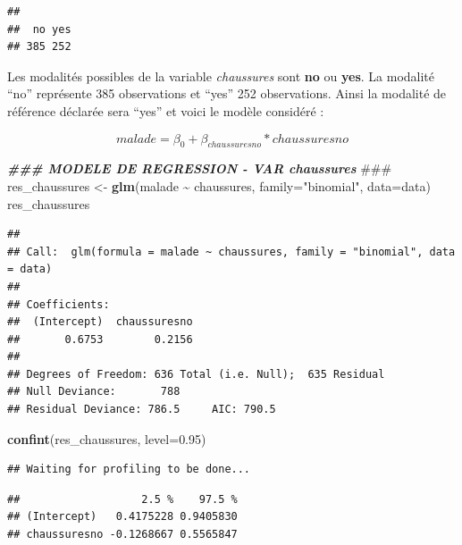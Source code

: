 \documentclass[
]{article}
\newenvironment{Shaded}{\begin{snugshade}}{\end{snugshade}}
\newcommand{\AlertTok}[1]{\textcolor[rgb]{0.94,0.16,0.16}{#1}}
\newcommand{\AttributeTok}[1]{\textcolor[rgb]{0.13,0.29,0.53}{#1}}
\newcommand{\DocumentationTok}[1]{\textcolor[rgb]{0.56,0.35,0.01}{\textbf{\textit{#1}}}}
\newcommand{\FloatTok}[1]{\textcolor[rgb]{0.00,0.00,0.81}{#1}}
\newcommand{\FunctionTok}[1]{\textcolor[rgb]{0.13,0.29,0.53}{\textbf{#1}}}
\newcommand{\NormalTok}[1]{#1}
\newcommand{\OtherTok}[1]{\textcolor[rgb]{0.56,0.35,0.01}{#1}}
\newcommand{\SpecialCharTok}[1]{\textcolor[rgb]{0.81,0.36,0.00}{\textbf{#1}}}
\newcommand{\StringTok}[1]{\textcolor[rgb]{0.31,0.60,0.02}{#1}}
\begin{document}
\begin{verbatim}
## 
##  no yes 
## 385 252
\end{verbatim}

Les modalités possibles de la variable \emph{chaussures} sont
\textbf{no} ou \textbf{yes}. La modalité ``no'' représente 385
observations et ``yes'' 252 observations. Ainsi la modalité de référence
déclarée sera ``yes'' et voici le modèle considéré :

\[malade = \beta_{0} + \beta_{chaussuresno} * chaussuresno \]

\begin{Shaded}
\begin{Highlighting}[]
\DocumentationTok{\#\#\# MODELE DE REGRESSION {-} VAR chaussures }\AlertTok{\#\#\#}
\NormalTok{res\_chaussures }\OtherTok{\textless{}{-}} \FunctionTok{glm}\NormalTok{(malade }\SpecialCharTok{\textasciitilde{}}\NormalTok{ chaussures, }\AttributeTok{family=}\StringTok{"binomial"}\NormalTok{, }\AttributeTok{data=}\NormalTok{data)}
\NormalTok{res\_chaussures}
\end{Highlighting}
\end{Shaded}

\begin{verbatim}
## 
## Call:  glm(formula = malade ~ chaussures, family = "binomial", data = data)
## 
## Coefficients:
##  (Intercept)  chaussuresno  
##       0.6753        0.2156  
## 
## Degrees of Freedom: 636 Total (i.e. Null);  635 Residual
## Null Deviance:       788 
## Residual Deviance: 786.5     AIC: 790.5
\end{verbatim}

\begin{Shaded}
\begin{Highlighting}[]
\FunctionTok{confint}\NormalTok{(res\_chaussures, }\AttributeTok{level=}\FloatTok{0.95}\NormalTok{)}
\end{Highlighting}
\end{Shaded}

\begin{verbatim}
## Waiting for profiling to be done...
\end{verbatim}

\begin{verbatim}
##                   2.5 %    97.5 %
## (Intercept)   0.4175228 0.9405830
## chaussuresno -0.1268667 0.5565847
\end{verbatim}
\end{document}
